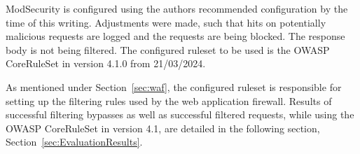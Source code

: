ModSecurity is configured using the authors recommended configuration by the time of this writing. \cite{modsec/recconf}
Adjustments were made, such that hits on potentially malicious requests are logged and the requests are being blocked. The response body is not being filtered.
The configured ruleset to be used is the OWASP CoreRuleSet in version 4.1.0 from 21/03/2024. \cite{crs/410dl}

As mentioned under Section~\ref{sec:waf}, the configured ruleset is responsible for setting up the filtering rules used by the web application firewall. Results of successful filtering bypasses as well as successful filtered requests, while using the OWASP CoreRuleSet in version 4.1, are detailed in the following section, Section~\ref{sec:EvaluationResults}.
